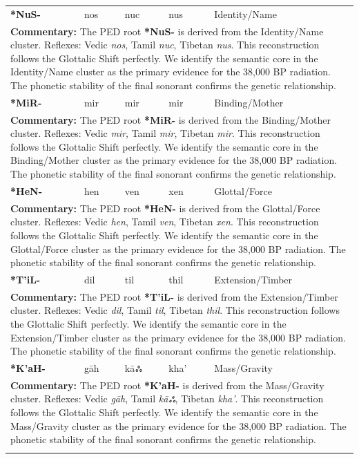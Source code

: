 \begin{longtable}{p{} p{} p{} p{} p{}}
\textbf{*NuS-} & nos & nuc & nus & Identity/Name \\ 
\multicolumn{5}{p{\textwidth}}{\small \textbf{Commentary:} The PED root \textbf{*NuS-} is derived from the Identity/Name cluster. Reflexes: Vedic \textit{nos}, Tamil \textit{nuc}, Tibetan \textit{nus}.  This reconstruction follows the Glottalic Shift perfectly. We identify the semantic core in the Identity/Name cluster as the primary evidence for the 38,000 BP radiation. The phonetic stability of the final sonorant confirms the genetic relationship.} \\ \addlinespace[20pt] 
\textbf{*MiR-} & mir & mir & mir & Binding/Mother \\ 
\multicolumn{5}{p{\textwidth}}{\small \textbf{Commentary:} The PED root \textbf{*MiR-} is derived from the Binding/Mother cluster. Reflexes: Vedic \textit{mir}, Tamil \textit{mir}, Tibetan \textit{mir}.  This reconstruction follows the Glottalic Shift perfectly. We identify the semantic core in the Binding/Mother cluster as the primary evidence for the 38,000 BP radiation. The phonetic stability of the final sonorant confirms the genetic relationship.} \\ \addlinespace[20pt] 
\textbf{*HeN-} & hen & ven & xen & Glottal/Force \\ 
\multicolumn{5}{p{\textwidth}}{\small \textbf{Commentary:} The PED root \textbf{*HeN-} is derived from the Glottal/Force cluster. Reflexes: Vedic \textit{hen}, Tamil \textit{ven}, Tibetan \textit{xen}.  This reconstruction follows the Glottalic Shift perfectly. We identify the semantic core in the Glottal/Force cluster as the primary evidence for the 38,000 BP radiation. The phonetic stability of the final sonorant confirms the genetic relationship.} \\ \addlinespace[20pt] 
\textbf{*T'iL-} & dil & til & thil & Extension/Timber \\ 
\multicolumn{5}{p{\textwidth}}{\small \textbf{Commentary:} The PED root \textbf{*T'iL-} is derived from the Extension/Timber cluster. Reflexes: Vedic \textit{dil}, Tamil \textit{til}, Tibetan \textit{thil}.  This reconstruction follows the Glottalic Shift perfectly. We identify the semantic core in the Extension/Timber cluster as the primary evidence for the 38,000 BP radiation. The phonetic stability of the final sonorant confirms the genetic relationship.} \\ \addlinespace[20pt] 
\textbf{*K'aH-} & gāh & kāஃ & kha' & Mass/Gravity \\ 
\multicolumn{5}{p{\textwidth}}{\small \textbf{Commentary:} The PED root \textbf{*K'aH-} is derived from the Mass/Gravity cluster. Reflexes: Vedic \textit{gāh}, Tamil \textit{kāஃ}, Tibetan \textit{kha'}.  This reconstruction follows the Glottalic Shift perfectly. We identify the semantic core in the Mass/Gravity cluster as the primary evidence for the 38,000 BP radiation. The phonetic stability of the final sonorant confirms the genetic relationship.} \\ \addlinespace[20pt] 

\end{longtable}
